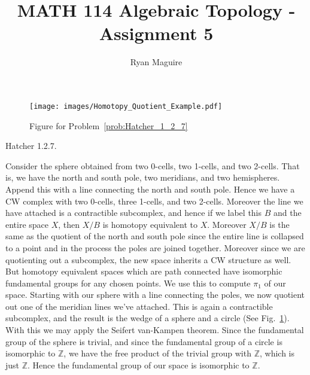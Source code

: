 \documentclass{article}                                                        %
\begin{document}
    \title{MATH 114 Algebraic Topology - Assignment 5}
    \author{Ryan Maguire}
    \date{\vspace{-5ex}}
    \maketitle
    \setcounter{section}{5}
    \begin{figure}[H]
        \centering
        \captionsetup{type=figure}
        \texttt{[image: images/Homotopy\_Quotient\_Example.pdf]}
        \caption{Figure for Problem~\ref{prob:Hatcher_1_2_7}}
        \label{fig:Fig_Prob_Hatcher_1_2_7}
    \end{figure}
    \begin{problem}
        \label{prob:Hatcher_1_2_7}%
        Hatcher 1.2.7.
    \end{problem}
    \begin{solution}
        Consider the sphere obtained from two 0-cells, two 1-cells, and two
        2-cells. That is, we have the north and south pole, two meridians, and
        two hemispheres. Append this with a line connecting the north and south
        pole. Hence we have a CW complex with two 0-cells, three
        1-cells, and two 2-cells. Moreover the line we have attached is a
        contractible subcomplex, and hence if we label this $B$ and the entire
        space $X$, then $X/B$ is homotopy equivalent to $X$. Moreover $X/B$ is
        the same as the quotient of the north and south pole since the entire
        line is collapsed to a point and in the process the poles are joined
        together. Moreover since we are quotienting out a subcomplex, the new
        space inherits a CW structure as well. But homotopy equivalent spaces
        which are path connected have isomorphic fundamental groups for any
        chosen points. We use this to compute $\pi_{1}$ of our space. Starting
        with our sphere with a line connecting the poles, we now quotient out
        one of the meridian lines we've attached. This is again a contractible
        subcomplex, and the result is the wedge of a sphere and a circle
        (See Fig.~\ref{fig:Fig_Prob_Hatcher_1_2_7}). With this we may apply the
        Seifert van-Kampen theorem. Since the fundamental group of the sphere is
        trivial, and since the fundamental group of a circle is isomorphic to
        $\mathbb{Z}$, we have the free product of the trivial group with
        $\mathbb{Z}$, which is just $\mathbb{Z}$. Hence the fundamental group of
        our space is isomorphic to $\mathbb{Z}$.
    \end{solution}
\end{document}
